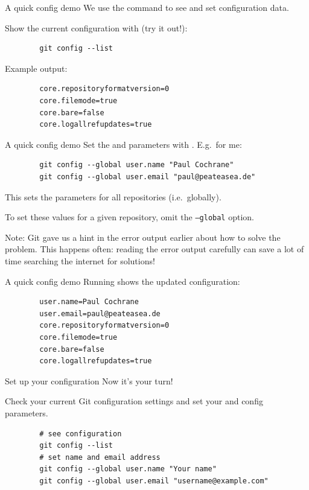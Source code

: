 \documentclass{git_course}
\begin{document}
\begin{frame}[fragile]{A quick config demo}
    We use the  command to see and set configuration data.

    Show the current configuration with (try it out!):
    \begin{verbatim}
        git config --list
    \end{verbatim}

    Example output:
    \begin{verbatim}
        core.repositoryformatversion=0
        core.filemode=true
        core.bare=false
        core.logallrefupdates=true
    \end{verbatim}
\end{frame}

\begin{frame}[fragile]{A quick config demo}
    Set the  and  parameters with .  E.g.\ for me:
    \begin{verbatim}
        git config --global user.name "Paul Cochrane"
        git config --global user.email "paul@peateasea.de"
    \end{verbatim}

    This sets the parameters for all repositories (i.e.\ globally).

    To set these values for a given repository, omit the
    \texttt{--global} option.

    Note: Git gave us a hint in the error output earlier about how to solve
    the problem.  This happens often: reading the error output carefully can
    save a lot of time searching the internet for solutions!
\end{frame}

\begin{frame}[fragile]{A quick config demo}
    Running  shows the updated configuration:
    \begin{verbatim}
        user.name=Paul Cochrane
        user.email=paul@peateasea.de
        core.repositoryformatversion=0
        core.filemode=true
        core.bare=false
        core.logallrefupdates=true
    \end{verbatim}
\end{frame}

\begin{frame}[fragile]{Set up your configuration}
    Now it's your turn!

    Check your current Git configuration settings and set your
     and  config parameters.

    \begin{verbatim}
        # see configuration
        git config --list
        # set name and email address
        git config --global user.name "Your name"
        git config --global user.email "username@example.com"
    \end{verbatim}
\end{frame}

\appendix

\end{document}
